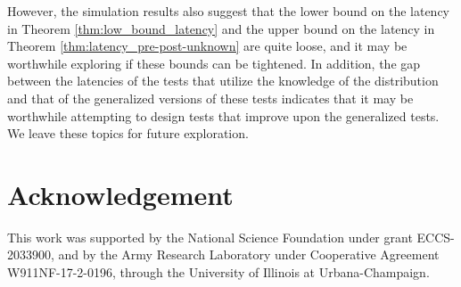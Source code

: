 \documentclass[12pt]{interact}
\newcommand{\lp}{\left(}
\newcommand{\rp}{\right)}
\newcommand{\mcal}{\mathcal}
\newcommand{\mrm}{\mathrm}
\theoremstyle{plain}
\begin{document}
However, the simulation results also suggest that the lower bound on the latency in Theorem \ref{thm:low_bound_latency} and the upper bound on the latency in Theorem \ref{thm:latency_pre-post-unknown} are quite loose, and it may be worthwhile exploring if these bounds can be tightened. In addition, the gap between the latencies of the tests that utilize the knowledge of the distribution and that of the generalized versions of these tests indicates that it may be worthwhile attempting to design tests that improve upon the generalized tests. We leave these topics for future exploration.

\section*{Acknowledgement}
This work was supported by the National Science Foundation under grant ECCS-2033900, and by the Army Research Laboratory under Cooperative Agreement W911NF-17-2-0196, through the University of Illinois at Urbana-Champaign.



\onecolumn

\appendix
\end{document}
